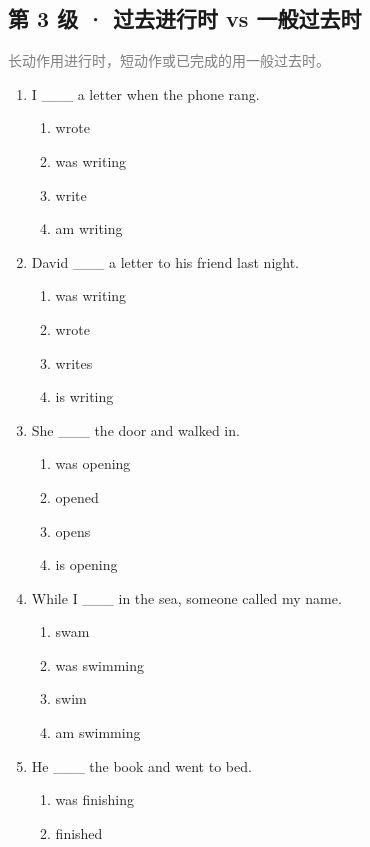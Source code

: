 \documentclass[11pt,a4paper]{ctexart}
\begin{document}
\subsection*{第 3 级 · 过去进行时 vs 一般过去时}
\noindent\textcolor{gray}{长动作用进行时，短动作或已完成的用一般过去时。}\par\smallskip
\begin{enumerate}[leftmargin=*,itemsep=4pt]
\item I \_\_\_ a letter when the phone rang.
\begin{enumerate}[label=\Alph*.,leftmargin=2em,itemsep=1pt,topsep=2pt]
\item wrote
\item was writing
\item write
\item am writing
\end{enumerate}
\item David \_\_\_ a letter to his friend last night.
\begin{enumerate}[label=\Alph*.,leftmargin=2em,itemsep=1pt,topsep=2pt]
\item was writing
\item wrote
\item writes
\item is writing
\end{enumerate}
\item She \_\_\_ the door and walked in.
\begin{enumerate}[label=\Alph*.,leftmargin=2em,itemsep=1pt,topsep=2pt]
\item was opening
\item opened
\item opens
\item is opening
\end{enumerate}
\item While I \_\_\_ in the sea, someone called my name.
\begin{enumerate}[label=\Alph*.,leftmargin=2em,itemsep=1pt,topsep=2pt]
\item swam
\item was swimming
\item swim
\item am swimming
\end{enumerate}
\item He \_\_\_ the book and went to bed.
\begin{enumerate}[label=\Alph*.,leftmargin=2em,itemsep=1pt,topsep=2pt]
\item was finishing
\item finished

\end{enumerate}
\end{enumerate}
\end{document}
